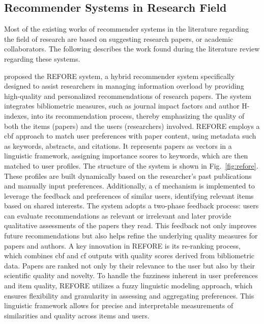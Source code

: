 \subsection*{Recommender Systems in Research Field}\label{sec:recommender-systems-in-research-field}
Most of the existing works of recommender systems in the literature regarding the field of research are based on suggesting research papers, or academic collaborators.
The following describes the work found during the literature review regarding these systems.

\textcite{refore} proposed the REFORE system, a hybrid recommender system specifically designed to assist researchers in managing information overload by providing high-quality and personalized recommendations of research papers.
The system integrates bibliometric measures, such as journal impact factors and author H-indexes, into its recommendation process, thereby emphasizing the quality of both the items (papers) and the users (researchers) involved.
REFORE employs a \gls{cbf} approach to match user preferences with paper content, using metadata such as keywords, abstracts, and citations.
It represents papers as vectors in a linguistic framework, assigning importance scores to keywords, which are then matched to user profiles.
The structure of the system is shown in Fig.~\ref{fig:refore}.
These profiles are built dynamically based on the researcher's past publications and manually input preferences.
Additionally, a \gls{cf} mechanism is implemented to leverage the feedback and preferences of similar users, identifying relevant items based on shared interests.
The system adopts a two-phase feedback process: users can evaluate recommendations as relevant or irrelevant and later provide qualitative assessments of the papers they read.
This feedback not only improves future recommendations but also helps refine the underlying quality measures for papers and authors.
A key innovation in REFORE is its re-ranking process, which combines \gls{cbf} and \gls{cf} outputs with quality scores derived from bibliometric data.
Papers are ranked not only by their relevance to the user but also by their scientific quality and novelty.
To handle the fuzziness inherent in user preferences and item quality, REFORE utilizes a fuzzy linguistic modeling approach, which ensures flexibility and granularity in assessing and aggregating preferences.
This linguistic framework allows for precise and interpretable measurements of similarities and quality across items and users.

